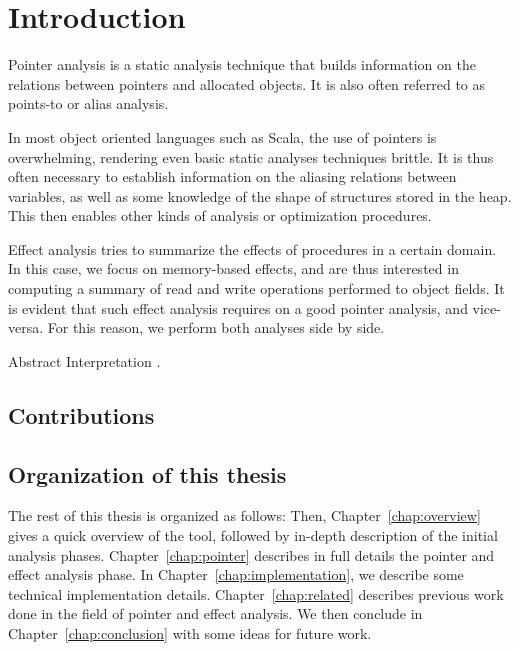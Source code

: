 \chapter{Introduction} \label{chap:intro}
Pointer analysis is a static analysis technique that builds information on the
relations between pointers and allocated objects. It is also often referred to
as points-to or alias analysis.

In most object oriented languages such as Scala, the use of pointers is
overwhelming, rendering even basic static analyses techniques brittle. It is
thus often necessary to establish information on the aliasing relations between
variables, as well as some knowledge of the shape of structures stored in the
heap. This then enables other kinds of analysis or optimization procedures.

Effect analysis tries to summarize the effects of procedures in a certain
domain. In this case, we focus on memory-based effects, and are thus interested
in computing a summary of read and write operations performed to object fields.
It is evident that such effect analysis requires on a good pointer analysis,
and vice-versa. For this reason, we perform both analyses side by side.

Abstract Interpretation \cite{DBLP:conf/popl/CousotC77,DBLP:conf/popl/CousotC02}.

\section{Contributions}

\section{Organization of this thesis}
The rest of this thesis is organized as follows: Then,
Chapter~\ref{chap:overview} gives a quick overview of the tool, followed by
in-depth description of the initial analysis phases.
Chapter~\ref{chap:pointer} describes in full details the pointer and effect
analysis phase.  In Chapter~\ref{chap:implementation}, we describe some
technical implementation details. Chapter~\ref{chap:related} describes previous
work done in the field of pointer and effect analysis. We then conclude in
Chapter~\ref{chap:conclusion} with some ideas for future work.
